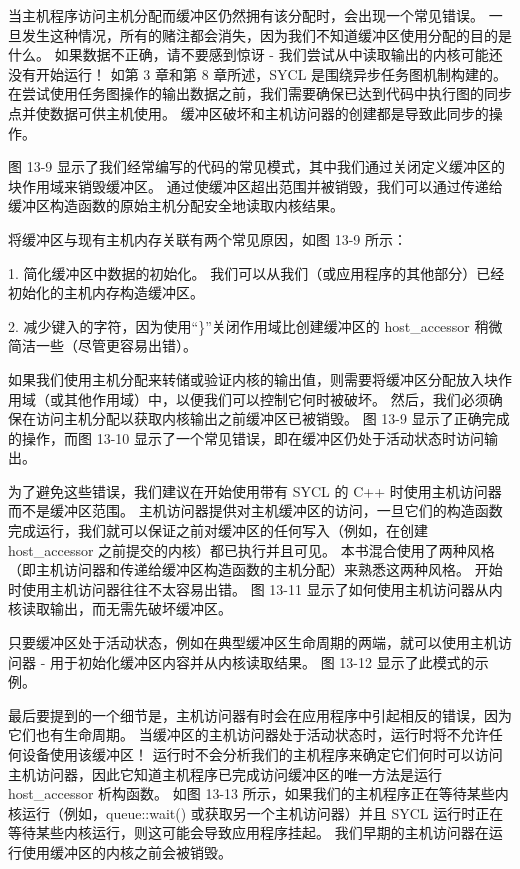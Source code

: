 当主机程序访问主机分配而缓冲区仍然拥有该分配时，会出现一个常见错误。 一旦发生这种情况，所有的赌注都会消失，因为我们不知道缓冲区使用分配的目的是什么。 如果数据不正确，请不要感到惊讶 - 我们尝试从中读取输出的内核可能还没有开始运行！ 如第 3 章和第 8 章所述，SYCL 是围绕异步任务图机制构建的。 在尝试使用任务图操作的输出数据之前，我们需要确保已达到代码中执行图的同步点并使数据可供主机使用。 缓冲区破坏和主机访问器的创建都是导致此同步的操作。

图 13-9 显示了我们经常编写的代码的常见模式，其中我们通过关闭定义缓冲区的块作用域来销毁缓冲区。 通过使缓冲区超出范围并被销毁，我们可以通过传递给缓冲区构造函数的原始主机分配安全地读取内核结果。

将缓冲区与现有主机内存关联有两个常见原因，如图 13-9 所示：

1. 简化缓冲区中数据的初始化。 我们可以从我们（或应用程序的其他部分）已经初始化的主机内存构造缓冲区。

2. 减少键入的字符，因为使用“\}”关闭作用域比创建缓冲区的 host\_accessor 稍微简洁一些（尽管更容易出错）。

如果我们使用主机分配来转储或验证内核的输出值，则需要将缓冲区分配放入块作用域（或其他作用域）中，以便我们可以控制它何时被破坏。 然后，我们必须确保在访问主机分配以获取内核输出之前缓冲区已被销毁。 图 13-9 显示了正确完成的操作，而图 13-10 显示了一个常见错误，即在缓冲区仍处于活动状态时访问输出。

为了避免这些错误，我们建议在开始使用带有 SYCL 的 C++ 时使用主机访问器而不是缓冲区范围。 主机访问器提供对主机缓冲区的访问，一旦它们的构造函数完成运行，我们就可以保证之前对缓冲区的任何写入（例如，在创建 host\_accessor 之前提交的内核）都已执行并且可见。 本书混合使用了两种风格（即主机访问器和传递给缓冲区构造函数的主机分配）来熟悉这两种风格。 开始时使用主机访问器往往不太容易出错。 图 13-11 显示了如何使用主机访问器从内核读取输出，而无需先破坏缓冲区。

只要缓冲区处于活动状态，例如在典型缓冲区生命周期的两端，就可以使用主机访问器 - 用于初始化缓冲区内容并从内核读取结果。 图 13-12 显示了此模式的示例。

最后要提到的一个细节是，主机访问器有时会在应用程序中引起相反的错误，因为它们也有生命周期。 当缓冲区的主机访问器处于活动状态时，运行时将不允许任何设备使用该缓冲区！ 运行时不会分析我们的主机程序来确定它们何时可以访问主机访问器，因此它知道主机程序已完成访问缓冲区的唯一方法是运行 host\_accessor 析构函数。 如图 13-13 所示，如果我们的主机程序正在等待某些内核运行（例如，queue::wait() 或获取另一个主机访问器）并且 SYCL 运行时正在等待某些内核运行，则这可能会导致应用程序挂起。 我们早期的主机访问器在运行使用缓冲区的内核之前会被销毁。

